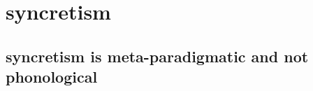 \documentclass[output=paper,colorlinks,citecolor=brown,
]{langscibook}
\begin{document}



\section{\sti syncretism} 

\subsection{\sti syncretism is meta-paradigmatic and not phonological}

\end{document}
